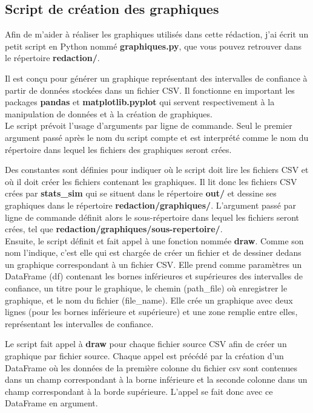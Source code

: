 \documentclass[12pt,french,titlepage]{article}
\begin{document}
\newpage

\subsection{Script de création des graphiques}
\label{sec:script_graph}
Afin de m'aider à réaliser les graphiques utilisés dans cette rédaction, j'ai écrit un petit script en Python nommé \textbf{graphiques.py}, que vous pouvez retrouver dans le répertoire \textbf{redaction/}. 

Il est conçu pour générer un graphique représentant des intervalles de confiance à partir de données stockées dans un fichier CSV. Il fonctionne en important les packages \textbf{pandas} et \textbf{matplotlib.pyplot} qui servent respectivement à la manipulation de données et à la création de graphiques.\\

Le script prévoit l'usage d'arguments par ligne de commande. Seul le premier argument passé après le nom du script compte et est interprété comme le nom du répertoire dans lequel les fichiers des graphiques seront crées.

Des constantes sont définies pour indiquer où le script doit lire les fichiers CSV et où il doit créer les fichiers contenant les graphiques. Il lit donc les fichiers CSV crées par \textbf{stats\_sim} qui se situent dans le répertoire \textbf{out/} et dessine ses graphiques dans le répertoire \textbf{redaction/graphiques/}. L'argument passé par ligne de commande définit alors le sous-répertoire dans lequel les fichiers seront crées, tel que \textbf{redaction/graphiques/sous-repertoire/}.\\

Ensuite, le script définit et fait appel à une fonction nommée \textbf{draw}. Comme son nom l'indique, c'est elle qui est chargée de créer un fichier et de dessiner dedans un graphique correspondant à un fichier CSV. Elle prend comme paramètres un DataFrame (df) contenant les bornes inférieures et supérieures des intervalles de confiance, un titre pour le graphique, le chemin (path\_file) où enregistrer le graphique, et le nom du fichier (file\_name). Elle crée un graphique avec deux lignes (pour les bornes inférieure et supérieure) et une zone remplie entre elles, représentant les intervalles de confiance.

Le script fait appel à \textbf{draw} pour chaque fichier source CSV afin de créer un graphique par fichier source. Chaque appel est précédé par la création d'un DataFrame où les données de la première colonne du fichier csv sont contenues dans un champ correspondant à la borne inférieure et la seconde colonne dans un champ correspondant à la borde supérieure. L'appel se fait donc avec ce DataFrame en argument.
\end{document}
